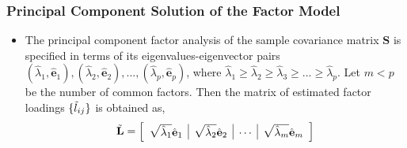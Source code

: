 \documentclass[10pt]{beamer} %
\begin{document}
\begin{frame}
   \frametitle{Principal Component Solution of the Factor Model}
   \begin{itemize}
      \item The principal component factor analysis of the sample covariance
         matrix $\mathbf{S}$ is specified in terms of its
         eigenvalues-eigenvector pairs
         $(\hat{\lambda}_1,\hat{\mathbf{e}}_1),(\hat{\lambda}_2, 
         \hat{\mathbf{e}}_2),...,(\hat{\lambda}_p,\hat{\mathbf{e}}_p)$,
         where $\hat{\lambda}_1 \geq \hat{\lambda}_2 \geq \hat{\lambda}_3
         \geq ... \geq \hat{\lambda}_p$. Let $m<p$ be the number of common
         factors. Then the matrix of estimated factor loadings
         $\{\Tilde{l}_{ij}\}$ is obtained as,
         \begin{equation*}
            \Tilde{\mathbf{L}} =
            \left[\begin{array}{c|c|c|c}
                  \sqrt{\hat{\lambda}_1}\hat{\mathbf{e}}_1 &
                  \sqrt{\hat{\lambda}_2}\hat{\mathbf{e}}_2 & \cdots &
                  \sqrt{\hat{\lambda}_m}\hat{\mathbf{e}}_m
               \end{array}
            \right]
         \end{equation*}			
   \end{itemize}
\end{frame}
\end{document}
